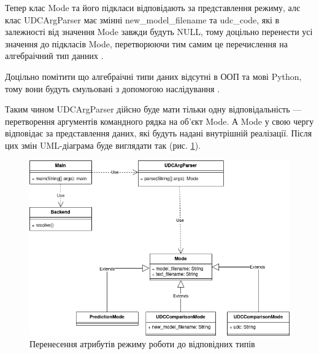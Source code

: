 \documentclass[14pt]{extarticle}
\begin{document}
  Тепер клас Mode та його підкласи відповідають за представлення режиму,
  алє клас UDCArgParser має змінні new\_model\_filename та udc\_code,
  які в залежності від значення Mode завжди будуть NULL,
  тому доцільно перенести усі значення до підкласів Mode,
  перетворюючи тим самим це перечислення на алгебраічний тип данних
  \cite{ADT_wiki}.
  
  Доцільно помітити що алгебраічні типи даних відсутні в ООП та мові Python,
  тому вони будуть ємульовані з допомогою наслідування
  \cite{Code_complete_34_4, ADT_composition_over_inheritance}.
  
  Таким чином UDCArgParser дійсно буде мати тільки одну відповідальність ---
  перетворення аргументів командного рядка на об'єкт Mode.
  А Mode у свою чергу відповідає за представлення даних,
  які будуть надані внутрішній реалізації.
  Після цих змін UML-діаграма буде виглядати так (рис. \ref{fig:io_uml4}).

  \begin{figure}[H]
    \centering
    \includegraphics[width=\textwidth]{io_uml4.drawio.png}    
    \caption{Перенесення атрибутів режиму роботи до відповідних типів}
    \label{fig:io_uml4}
  \end{figure}
  
\end{document}
